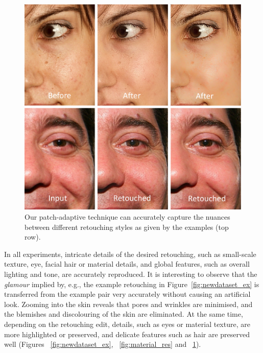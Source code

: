 \begin{figure}[th] %
    \centering
	\includegraphics[width=\columnwidth]{Chapters/detail-retouching-figs/Nuances.pdf}
    \caption{Our patch-adaptive technique can accurately capture the nuances between different
    retouching styles as given by the examples (top row).}
\label{fig:retouchingstyles}
\end{figure}

In all experiments, intricate details of the desired retouching, such as small-scale texture, eye, facial hair or material details, and global features, such as overall lighting and tone, are accurately reproduced. It is interesting to observe that the \emph{glamour} implied by, e.g., the example retouching in Figure~\ref{fig:newdataset_ex} is transferred from the example pair very accurately without causing an artificial look. Zooming into the skin reveals that pores and wrinkles are minimised, and the blemishes and discolouring of the skin are eliminated. At the same time, depending on the retouching edit, details, such as eyes or material texture, are more highlighted or preserved, and delicate features such as hair are preserved well (Figures ~\ref{fig:newdataset_ex}, ~\ref{fig:material_res} and ~\ref{fig:retouchingstyles}). 

